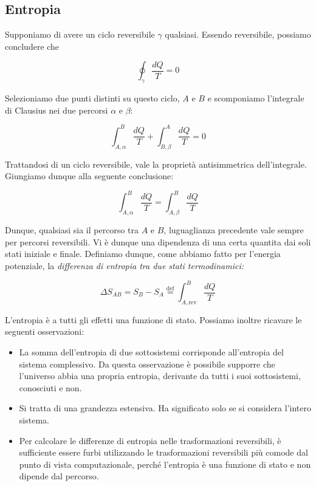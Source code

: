 \subsection*{Entropia}
Supponiamo di avere un ciclo reversibile $\gamma$ qualsiasi. Essendo
reversibile, possiamo concludere che

\[ \oint_\gamma \frac{dQ}{T} = 0 \]

\noindent Selezioniamo due punti distinti su questo ciclo, $A$ e $B$
e scomponiamo l'integrale di Clausius nei due percorsi $\alpha$ e
$\beta$:

\[ \int_{A,\alpha}^{B} \frac{dQ}{T} + \int_{B,\beta}^{A} \frac{dQ}{T} = 0 \]

\noindent Trattandosi di un ciclo reversibile, vale la proprietà
antisimmetrica dell'integrale. Giungiamo dunque alla seguente conclusione:

\[ \int_{A,\alpha}^{B} \frac{dQ}{T} = \int_{A,\beta}^{B} \frac{dQ}{T} \]

\noindent Dunque, qualsiasi sia il percorso tra $A$ e $B$, luguaglianza
precedente vale sempre per percorsi reversibili. Vi è dunque una dipendenza
di una certa quantita dai soli stati iniziale e finale. Definiamo dunque,
come abbiamo fatto per l'energia potenziale, la \textit{differenza di
entropia tra due stati termodinamici:}

\[ \Delta S_{AB} = S_B - S_A \stackrel{\text{def}}{=} \int_{A,\text{rev}}^{B} \frac{dQ}{T} \]

\noindent L'entropia è a tutti gli effetti una funzione di stato. Possiamo
inoltre ricavare le seguenti osservazioni:

\begin{itemize}
    \item La somma dell'entropia di due sottosistemi corrisponde all'entropia
    del sistema complessivo. Da questa osservazione è possibile supporre
    che l'universo abbia una propria entropia, derivante da tutti i suoi
    sottosistemi, conosciuti e non.

    \item Si tratta di una grandezza estensiva. Ha significato solo se si
    considera l'intero sistema.

    \item Per calcolare le differenze di entropia nelle trasformazioni
    reversibili, è sufficiente essere furbi utilizzando le trasformazioni
    reversibili più comode dal punto di vista computazionale, perché
    l'entropia è una funzione di stato e non dipende dal percorso.
\end{itemize}


